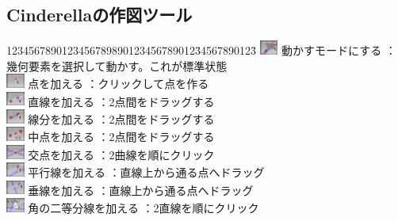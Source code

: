 \documentclass[papersize,a4paper,12pt,uplatex]{jsarticle}
\begin{document}
\hypertarget{geometrytool}{}
\subsection{Cinderellaの作図ツール}
 \begin{tabbing}
1234567890123456789890123456789012\=34567890123\=\kill
\includegraphics[bb=0 0 6.48 5.04 , width=0.6cm]{Fig/move.pdf}    動かすモードにする \>：幾何要素を選択して動かす。これが標準状態\\
\includegraphics[bb=0 0 6.48 5.04 , width=0.6cm]{Fig/single-add.pdf}    点を加える   \>：クリックして点を作る\\
\includegraphics[bb=0 0 6.48 5.04 , width=0.6cm]{Fig/multi-add-line.pdf}    直線を加える   \>：2点間をドラッグする\\
\includegraphics[bb=0 0 6.48 5.04 , width=0.6cm]{Fig/segment.pdf}    線分を加える   \>：2点間をドラッグする\\
\includegraphics[bb=0 0 6.48 5.04 , width=0.6cm]{Fig/middle.pdf}    中点を加える   \>：2点間をドラッグする\\
\includegraphics[bb=0 0 6.48 5.04 , width=0.6cm]{Fig/intersection.pdf}    交点を加える   \>：2曲線を順にクリック\\
\includegraphics[bb=0 0 6.48 5.04 , width=0.6cm]{Fig/multi-add-parallel.pdf}    平行線を加える   \>：直線上から通る点へドラッグ\\
\includegraphics[bb=0 0 6.48 5.04 , width=0.6cm]{Fig/multi-add-perp.pdf}    垂線を加える   \>：直線上から通る点へドラッグ\\
\includegraphics[bb=0 0 6.48 5.04 , width=0.6cm]{Fig/bisector.pdf}    角の二等分線を加える   \>：2直線を順にクリック\\

\end{tabbing}
\end{document}
